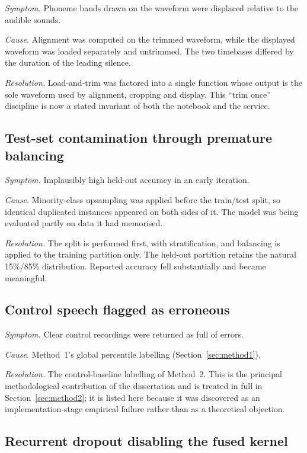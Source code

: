 \emph{Symptom.} Phoneme bands drawn on the waveform were displaced relative to
the audible sounds.

\emph{Cause.} Alignment was computed on the trimmed waveform, while the
displayed waveform was loaded separately and untrimmed. The two timebases
differed by the duration of the leading silence.

\emph{Resolution.} Load-and-trim was factored into a single function whose
output is the sole waveform used by alignment, cropping and display. This
``trim once'' discipline is now a stated invariant of both the notebook and the
service.

\subsection{Test-set contamination through premature balancing}

\emph{Symptom.} Implausibly high held-out accuracy in an early iteration.

\emph{Cause.} Minority-class upsampling was applied before the train/test split,
so identical duplicated instances appeared on both sides of it. The model was
being evaluated partly on data it had memorised.

\emph{Resolution.} The split is performed first, with stratification, and
balancing is applied to the training partition only. The held-out partition
retains the natural 15\%/85\% distribution. Reported accuracy fell substantially
and became meaningful.

\subsection{Control speech flagged as erroneous}

\emph{Symptom.} Clear control recordings were returned as full of errors.

\emph{Cause.} Method~1's global percentile labelling
(Section~\ref{sec:method1}).

\emph{Resolution.} The control-baseline labelling of Method~2. This is the
principal methodological contribution of the dissertation and is treated in full
in Section~\ref{sec:method2}; it is listed here because it was discovered as an
implementation-stage empirical failure rather than as a theoretical objection.

\subsection{Recurrent dropout disabling the fused kernel}

